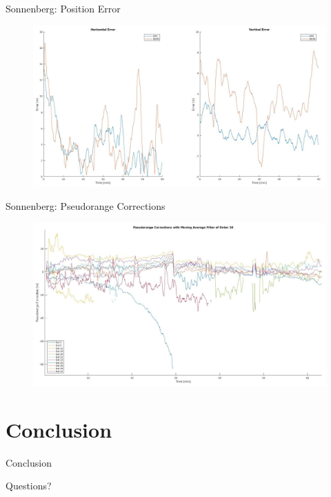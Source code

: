 \documentclass[12pt, compress, xcolor=table]{beamer}
\begin{document}
\begin{frame}{Sonnenberg: Position Error}
 \begin{figure}
  \centering
  \includegraphics[width=\textwidth]{images/Errors_Kriens.jpg}
 \end{figure}
\end{frame}

\begin{frame}{Sonnenberg: Pseudorange Corrections}
 \begin{figure}
  \centering
  \includegraphics[width=\textwidth]{images/PRCs_Kriens.jpg}
 \end{figure}
\end{frame}


\section{Conclusion}

\begin{frame}{Conclusion}
 
\end{frame}


\begin{frame}[standout]
 Questions?
\end{frame}
\end{document}
